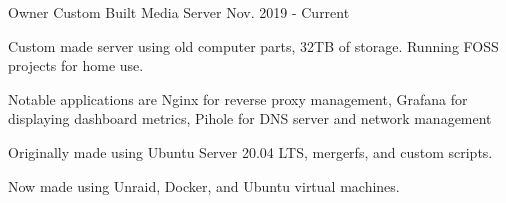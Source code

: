 

\begin{cventries}

  \cventry
    {Owner} %
    {Custom Built Media Server} %
    {} %
    {Nov. 2019 - Current} %
    {
      \begin{cvitems} %
        \item {Custom made server using old computer parts, 32TB of storage. Running FOSS projects for home use.}
        \item {Notable applications are Nginx for reverse proxy management, Grafana for displaying dashboard metrics, Pihole for DNS server and network management}
        \item {Originally made using Ubuntu Server 20.04 LTS, mergerfs, and custom scripts.}
        \item {Now made using Unraid, Docker, and Ubuntu virtual machines.}
      \end{cvitems}
    }




\end{cventries}
